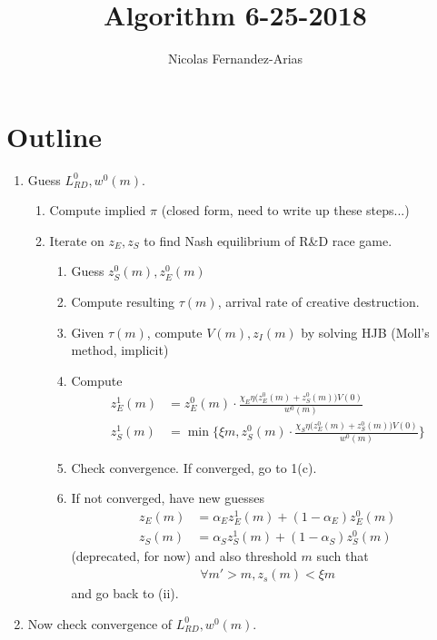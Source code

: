 \documentclass[12pt,english]{article}
\theoremstyle{remark}
\begin{document}
	
\title{Algorithm 6-25-2018}
\author{Nicolas Fernandez-Arias}
\maketitle

\section{Outline}

\begin{enumerate}
	\item Guess $L^0_{RD}, w^0(m)$.  
	\begin{enumerate}
		\item Compute implied $\pi$ (closed form, need to write up these steps...)
		\item Iterate on $z_E,z_S$ to find Nash equilibrium of R\&D race game.
		\begin{enumerate}
			\item Guess $z_S^0(m),z_E^0(m)$
			\item Compute resulting $\tau(m)$, arrival rate of creative destruction. 
			\item Given $\tau(m)$, compute $V(m),z_I(m)$ by solving HJB (Moll's method, implicit)
			\item Compute
			\begin{align*}
			z_E^1(m) &= z_E^0(m) \cdot \frac{\chi_E \eta \big(z_E^0(m) + z_S^0(m)\big)V(0)}{w^0(m)} \\
			z_S^1(m) &= \min\Bigg\{\xi m,z_S^0(m) \cdot \frac{\chi_S \eta \big(z_E^0(m) + z_S^0(m)\big)V(0)}{w^0(m)}\Bigg\}
			\end{align*}
			\item Check convergence. If converged, go to 1(c).
			\item If not converged, have new guesses
			\begin{align*}
			z_E(m) &= \alpha_E z_E^1(m) + (1-\alpha_E) z_E^0(m) \\
			z_S(m) &= \alpha_S z_S^1(m) + (1-\alpha_S) z_S^0(m) 
			\end{align*}
			(deprecated, for now) and also threshold $m$ such that
			\begin{align*}
				\forall m' > m, z_s(m) < \xi m
			\end{align*}
			and go back to (ii). 
		\end{enumerate} 
	\end{enumerate}
	\item Now check convergence of $L^0_{RD},w^0(m)$.

\end{enumerate}
\end{document}
